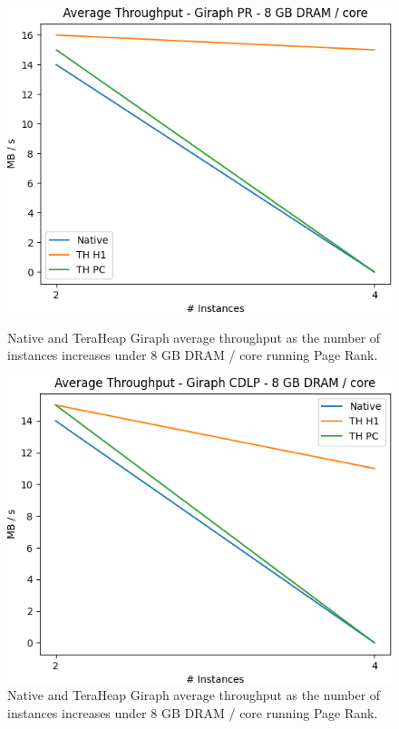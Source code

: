 \begin{figure}[thbp]
        \centering
        \includegraphics[width=\linewidth]{./fig/G_PR_128_THR.png}
    \caption{Native and TeraHeap Giraph average throughput
        as the number of instances increases under 8 GB DRAM / core running Page Rank.}
        \label{fig:g_pr_128_thr}
        \includegraphics[width=\linewidth]{./fig/G_CDLP_128_THR.png}
    \caption{Native and TeraHeap Giraph average throughput
        as the number of instances increases under 8 GB DRAM / core running Page Rank.}
	\label{fig:g_cdlp_128_thr}
\end{figure}

